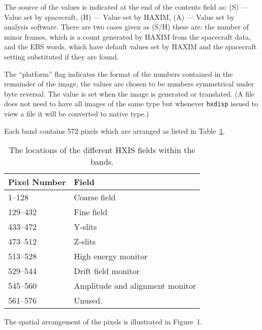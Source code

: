 The source of the values is indicated at the end of the contents field as:
(S) --- Value set by spacecraft, (H) --- Value set by HAXIM, (A) --- Value set
by analysis software. There are two cases given as (S/H) 
these
are: the number of minor frames, which is a count generated by HAXIM from the
spacecraft data, and the EBS words, which have default values set by HAXIM and
the spacecraft setting substituted if they are found. 

The ``platform'' flag indicates the format of the numbers contained in
the remainder of the image, the values are chosen to be numbers
symmetrical under byte reversal. The value is set when the image is
generated or translated. (A file does not need to have all images of
the same type but whenever \verb!hxdisp! issued to view a file it
will be converted to native type.)

Each band contains 572 pixels which are arranged as listed in Table~\ref{pxls}.
\begin{table}
\begin{center}
\caption{\label{pxls} The locations of the different HXIS fields within the
bands.}
\begin{tabular}{|ll|}
\hline
Pixel Number & Field \\ \hline
1--128 & Coarse field \\
129--432 & Fine field \\
433--472 & Y-slits \\
473--512 & Z-slits \\
513--528 & High energy monitor \\
529--544 & Drift field monitor \\
545--560 & Amplitude and alignment monitor \\
561--576 & Unused. \\ \hline
\end{tabular}
\end{center}
\end{table}

The spatial arrangement of the pixels is illustrated in Figure~1.


          
